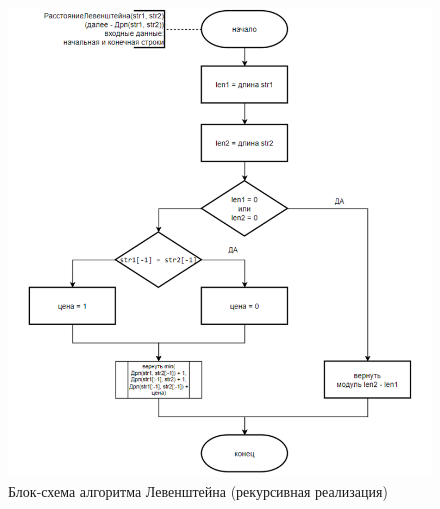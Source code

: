 \begin{figure}[H]
    \centering
    \includegraphics[width=1.1\textwidth]{img/block_1_2.png}
    \caption{Блок-схема алгоритма Левенштейна (рекурсивная реализация)}
\end{figure}


